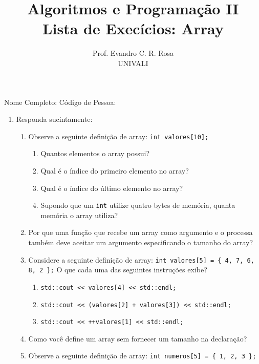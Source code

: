 \documentclass[12pt]{article}
\title{Algoritmos e Programação II\\
\large Lista de Execícios: Array}
\author{Prof. Evandro C. R. Rosa\\UNIVALI}
\date{}
\begin{document}
\maketitle

\noindent Nome Completo: \underline{\hspace{8cm}} Código de Pessoa: \underline{\hspace{2.4cm}}

\begin{enumerate}
      \item Responda sucintamente:
            \begin{enumerate}
                  \item Observe a seguinte definição de array: \texttt{int valores[10];}
                        \begin{enumerate}
                              \item Quantos elementos o array possui?
                              \item Qual é o índice do primeiro elemento no array?
                              \item Qual é o índice do último elemento no array?
                              \item Supondo que um \texttt{int} utilize quatro bytes de memória, quanta memória o array utiliza?
                        \end{enumerate}
                  \item Por que uma função que recebe um array como argumento e o processa também deve aceitar um argumento especificando o tamanho do array?
                  \item Considere a seguinte definição de array: \texttt{int valores[5] = \{ 4, 7, 6, 8, 2 \};} O que cada uma das seguintes instruções exibe?
                        \begin{enumerate}
                              \item \texttt{std::cout << valores[4] << std::endl;}
                              \item \texttt{std::cout << (valores[2] + valores[3]) << std::endl;}
                              \item \texttt{std::cout << ++valores[1] << std::endl;}
                        \end{enumerate}
                  \item Como você define um array sem fornecer um tamanho na declaração?
                  \item Observe a seguinte definição de array: \texttt{int numeros[5] = \{ 1, 2, 3 \};}

\end{enumerate}
\end{enumerate}
\end{document}
